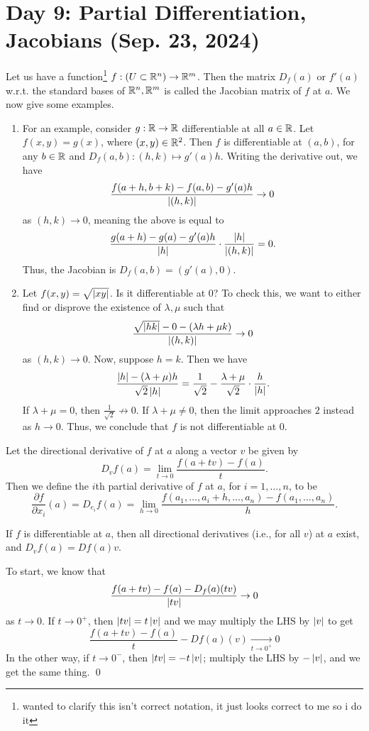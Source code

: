 \section{Day 9: Partial Differentiation, Jacobians (Sep. 23, 2024)}
Let us have a function\footnote{wanted to clarify this isn't correct notation, it just looks correct to me so i do it} $f : (U \subset \mathbb R^n) \to \mathbb R^m$. Then the matrix $D_f(a)$ or $f'(a)$ w.r.t. the standard bases of $\mathbb R^n, \mathbb R^m$ is called the Jacobian matrix of $f$ at $a$.
\medskip\newline
\noindent We now give some examples.
\begin{enumerate}[label=(\alph*)]
    \item For an example, consider $g : \mathbb R \to \mathbb R$ differentiable at all $a \in \mathbb R$. Let $f(x, y) = g(x)$, where $(x, y) \in \mathbb R^2$. Then $f$ is differentiable at $(a, b)$, for any $b \in \mathbb R$ and $D_f(a, b) : (h, k) \mapsto g'(a) h$. Writing the derivative out, we have
    \[ \frac{f(a+h, b+k) - f(a, b) - g'(a) h}{\left\lvert (h, k) \right\rvert} \to 0 \]
    as $(h, k) \to 0$, meaning the above is equal to
    \[ \frac{g(a + h) - g(a) - g'(a)h}{\left\lvert h \right\rvert} \cdot \frac{\left\lvert h \right\rvert}{\left\lvert (h, k) \right\rvert} = 0. \]
    Thus, the Jacobian is $D_f(a, b) = (g'(a), 0)$.
    \item Let $f(x, y) = \sqrt{\left\lvert xy \right\rvert}$. Is it differentiable at $0$? To check this, we want to either find or disprove the existence of $\lambda, \mu$ such that
    \[ \frac{\sqrt{\left\lvert hk \right\rvert} - 0 - (\lambda h + \mu k)}{\left\lvert (h, k) \right\rvert} \to 0 \]
    as $(h, k) \to 0$. Now, suppose $h = k$. Then we have
    \[ \frac{\left\lvert h \right\rvert - (\lambda + \mu)h}{\sqrt{2} \left\lvert h \right\rvert} = \frac{1}{\sqrt{2}} - \frac{\lambda + \mu}{\sqrt{2}} \cdot \frac{h}{\left\lvert h \right\rvert}. \]
    If $\lambda + \mu = 0$, then $\frac{1}{\sqrt{2}} \not\to 0$. If $\lambda + \mu \neq 0$, then the limit approaches $2$ instead as $h \to 0$. Thus, we conclude that $f$ is not differentiable at $0$.
\end{enumerate}

\noindent Let the directional derivative of $f$ at $a$ along a vector $v$ be given by
\[ D_v f(a)= \lim_{t \to 0} \frac{f(a + tv) - f(a)}{t}. \]
Then we define the $i$th partial derivative of $f$ at $a$, for $i = 1, \dots, n$, to be
\[ \frac{\partial f}{\partial x_i}(a) = D_{e_i} f(a) = \lim_{h \to 0} \frac{f(a_1, \dots, a_i + h, \dots, a_n) - f(a_1, \dots, a_n)}{h}. \]
\begin{simplelemma}
    If $f$ is differentiable at $a$, then all directional derivatives (i.e., for all $v$) at $a$ exist, and $D_v f(a) = D f(a) v$.
\end{simplelemma}
\noindent To start, we know that
\[ \frac{f(a + tv) - f(a) - D_f(a)(tv)}{\left\lvert tv \right\rvert} \to 0 \]
as $t \to 0$. If $t \to 0^+$, then $\left\lvert tv \right\rvert = t\left\lvert v \right\rvert$ and we may multiply the LHS by $\left\lvert v \right\rvert$ to get
\[ \frac{f(a + tv) - f(a)}{t} - Df(a)(v) \xrightarrow[t \to 0^+]{} 0 \]
In the other way, if $t \to 0^-$, then $\left\lvert tv \right\rvert = -t\left\lvert v \right\rvert$; multiply the LHS by $-\left\lvert v \right\rvert$, and we get the same thing. \qed